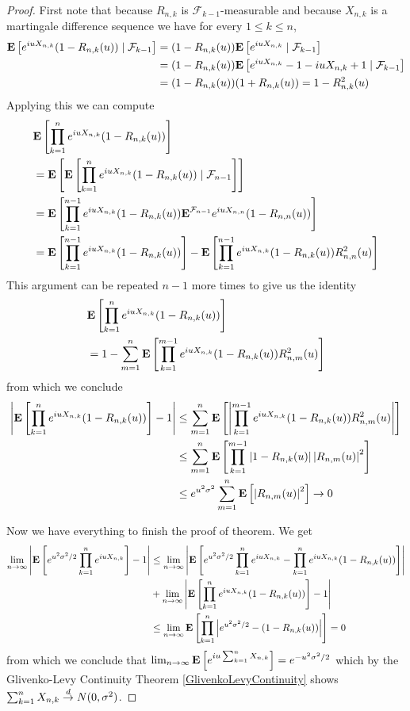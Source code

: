 \begin{proof}
First note that because $R_{n,k}$ is $\mathcal{F}_{k-1}$-measurable and because $X_{n,k}$ is a martingale difference sequence we have for every $1 \leq k \leq n$,
\begin{align*}
\cexpectationlong{\mathcal{F}_{k-1}}{e^{iuX_{n,k}} (1 - R_{n,k}(u))} &=
(1 - R_{n,k}(u))\cexpectationlong{\mathcal{F}_{k-1}}{e^{iuX_{n,k}}} \\
&=(1 - R_{n,k}(u))\cexpectationlong{\mathcal{F}_{k-1}}{e^{iuX_{n,k}} -1 -iuX_{n,k} + 1} \\
&= (1 - R_{n,k}(u)) (1 + R_{n,k}(u)) = 1 - R_{n,k}^2(u)
\end{align*}
Applying this we can compute
\begin{align*}
&\expectation{\prod_{k=1}^n e^{iuX_{n,k}} (1 - R_{n,k}(u)) }\\
&=\expectation{\cexpectationlong{\mathcal{F}_{n-1}}{\prod_{k=1}^n e^{iuX_{n,k}} (1 - R_{n,k}(u)) }} \\
&=\expectation{\prod_{k=1}^{n-1} e^{iuX_{n,k}} (1 - R_{n,k}(u))\cexpectation{\mathcal{F}_{n-1}}{ e^{iuX_{n,n}} (1 - R_{n,n}(u))}} \\
&=\expectation{\prod_{k=1}^{n-1} e^{iuX_{n,k}} (1 - R_{n,k}(u))} - \expectation{\prod_{k=1}^{n-1} e^{iuX_{n,k}} (1 - R_{n,k}(u)) R^2_{n,n}(u)} 
\end{align*}
This argument can be repeated $n-1$ more times to give us the identity
\begin{align*}
&\expectation{\prod_{k=1}^n e^{iuX_{n,k}} (1 - R_{n,k}(u)) }\\
&=1 - \sum_{m=1}^n \expectation{\prod_{k=1}^{m-1} e^{iuX_{n,k}} (1 - R_{n,k}(u)) R^2_{n,m}(u)} 
\end{align*}
from which we conclude 
\begin{align*}
\abs{\expectation{\prod_{k=1}^n e^{iuX_{n,k}} (1 - R_{n,k}(u)) } - 1} 
&\leq \sum_{m=1}^n \expectation{\abs{\prod_{k=1}^{m-1} e^{iuX_{n,k}} (1 - R_{n,k}(u)) R^2_{n,m}(u)}} \\
&\leq \sum_{m=1}^n \expectation{\prod_{k=1}^{m-1} \abs{ 1 - R_{n,k}(u)} \abs{R_{n,m}(u)}^2}  \\
&\leq e^{u^2\sigma^2} \sum_{m=1}^n \expectation{\abs{R_{n,m}(u)}^2}  \to 0\\
\end{align*}

Now we have everything to finish the proof of theorem.  We get
\begin{align*}
\lim_{n \to \infty} \abs{\expectation{e^{u^2 \sigma^2/2} \prod_{k=1}^n e^{iuX_{n,k}}} -1}  
&\leq \lim_{n \to \infty} \abs{\expectation{e^{u^2 \sigma^2/2} \prod_{k=1}^n e^{iuX_{n,k}} - \prod_{k=1}^n e^{iuX_{n,k}} (1 - R_{n,k}(u))} }  \\
&+\lim_{n \to \infty} \abs{\expectation{\prod_{k=1}^n e^{iuX_{n,k}} (1 - R_{n,k}(u))}-1} \\
&\leq \lim_{n \to \infty} \expectation{ \prod_{k=1}^n \abs{e^{u^2 \sigma^2/2} - (1 - R_{n,k}(u))}} = 0
\end{align*}
from which we conclude that $\lim_{n \to \infty} \expectation{e^{iu\sum_{k=1}^n X_{n,k}}} = e^{-u^2 \sigma^2/2}$ which by
the Glivenko-Levy Continuity Theorem \ref{GlivenkoLevyContinuity} shows $\sum_{k=1}^n X_{n,k} \todist N(0, \sigma^2)$.
\end{proof}

